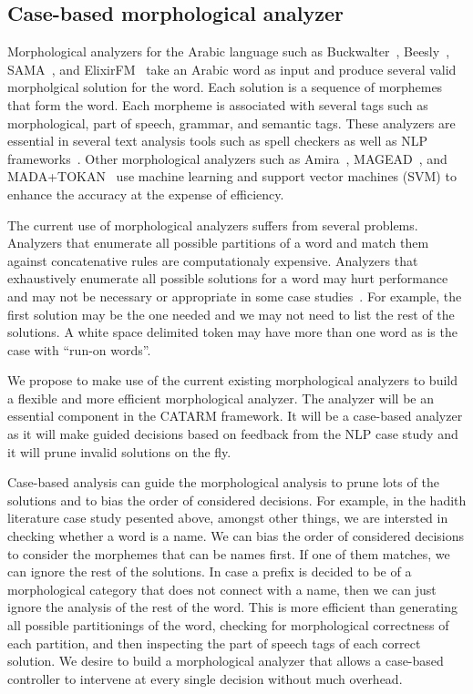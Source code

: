 \documentclass[12pt]{article}
\begin{document}
\subsection{Case-based morphological analyzer}

Morphological analyzers for the Arabic language
such as Buckwalter~\cite{Buckwalter:02},
Beesly~\cite{Beesley:01}, SAMA~\cite{Kulick:10},
and ElixirFM~\cite{Otakar:07} take an Arabic word as input
and produce several valid morpholgical solution for the word. 
Each solution is a sequence of morphemes that form the word.
Each morpheme is associated with several tags such as 
morphological, part of speech, grammar, and semantic tags. 
These analyzers are essential in several text analysis tools such 
as spell checkers as well as NLP frameworks~\cite{Col09}.
Other morphological analyzers such as 
Amira~\cite{Diab:07,Benajiba:07},
MAGEAD~\cite{Habash:05}, and MADA+TOKAN~\cite{Habash:09} 
use machine learning and support vector machines (SVM) 
to enhance the accuracy at the expense of efficiency.

The current use of morphological analyzers suffers from 
several problems. 
Analyzers that enumerate all possible partitions of a word
and match them against concatenative rules are computationaly 
expensive. 
Analyzers that exhaustively enumerate all possible solutions 
for a word may hurt performance and may
not be necessary or appropriate in some case studies~\cite{Maamouri:10}. 
For example, the first solution may be the one needed and 
we may not need to list the rest of the solutions. 
A white space delimited token may have more than one word
as is the case with ``run-on words''.

We propose to make use of the current existing morphological
analyzers to build a flexible and more efficient
morphological analyzer. 
The analyzer will be an essential
component in the CATARM framework. 
It will be a case-based analyzer as it will make guided decisions
based on feedback from the NLP case study and it will prune
invalid solutions on the fly. 

Case-based analysis can guide the morphological analysis
to prune lots of the solutions and to bias the order of considered
decisions. 
For example, in the hadith literature case study pesented above, 
amongst other things, we are intersted in checking whether a 
word is a name.  
We can bias the order of considered decisions to consider the 
morphemes that can be names first. 
If one of them matches, we can ignore the rest of the solutions. 
In case a prefix is decided to be of a morphological category
that does not connect with a name, then we can just ignore
the analysis of the rest of the word. 
This is more efficient than generating all possible partitionings
of the word, checking for morphological correctness of each 
partition, and then inspecting the part of speech tags of each
correct solution. 
We desire to build a morphological analyzer that allows a 
case-based controller to intervene at every single decision
without much overhead. 
\end{document}
